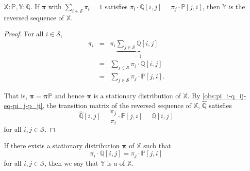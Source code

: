 \begin{observation}
$ \mathbb{X}: \mathbb{P}, \mathbb{Y}: \mathbb{Q} $.
If $ \boldsymbol\pi $ with $ \sum_{i \in \mathcal{S}} \pi_{i} = 1 $ satisfies $ \pi_{i} \cdot \mathbb{Q}[i, j] = \pi_{j} \cdot \mathbb{P}[j, i] $, then $ \mathbb{Y} $ is the reversed sequence of $ \mathbb{X} $.
\begin{proof}
For all $ i \in \mathcal{S} $,
\begin{eqnarray*}
\pi_{i}
  & = & \pi_{i} \underbrace{\sum_{j \in \mathcal{S}} \mathbb{Q}[i, j]}_{= 1} \\
  & = & \sum_{j \in \mathcal{S}} \pi_{i} \cdot \mathbb{Q}[i, j] \\
  & = & \sum_{j \in \mathcal{S}} \pi_{j} \cdot \mathbb{P}[j, i].
\end{eqnarray*}

That is, $ \boldsymbol\pi = \boldsymbol\pi \mathbb{P} $ and hence $ \boldsymbol\pi $ is a stationary distribution of $ \mathbb{X} $. By \autoref{obs:pi_i-q_ij-eq-pi_j-p_ji}, the transition matrix of the reversed sequence of $ \mathbb{X} $, $ \hat{\mathbb{Q}} $ satisfies
  \[ \hat{\mathbb{Q}}[i, j] = \frac{\pi_{j}}{\pi_i} \cdot \mathbb{P}[j, i] = \mathbb{Q}[i, j] \]
for all $ i, j \in \mathcal{S} $.
\end{proof}
\end{observation}

\begin{definition}
If there exists a stationary distribution $ \boldsymbol\pi $ of $ \mathbb{X} $ such that
\[ \pi_{i} \cdot \mathbb{Q}[i, j] = \pi_{j} \cdot \mathbb{P}[j, i] \]
for all $ i, j \in \mathcal{S} $,
then we say that $ \mathbb{Y} $ is a  of $ \mathbb{X} $.
\end{definition}
